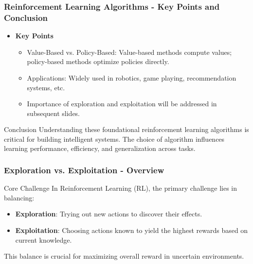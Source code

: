 \documentclass[aspectratio=169]{beamer}
\begin{document}
\begin{frame}[fragile]
    \frametitle{Reinforcement Learning Algorithms - Key Points and Conclusion}
    \begin{itemize}
        \item \textbf{Key Points}
        \begin{itemize}
            \item Value-Based vs. Policy-Based: Value-based methods compute values; policy-based methods optimize policies directly.
            \item Applications: Widely used in robotics, game playing, recommendation systems, etc.
            \item Importance of exploration and exploitation will be addressed in subsequent slides.
        \end{itemize}
    \end{itemize}
    \begin{block}{Conclusion}
        Understanding these foundational reinforcement learning algorithms is critical for building intelligent systems. The choice of algorithm influences learning performance, efficiency, and generalization across tasks.
    \end{block}
\end{frame}

\begin{frame}[fragile]
    \frametitle{Exploration vs. Exploitation - Overview}
    \begin{block}{Core Challenge}
        In Reinforcement Learning (RL), the primary challenge lies in balancing:
        \begin{itemize}
            \item \textbf{Exploration}: Trying out new actions to discover their effects.
            \item \textbf{Exploitation}: Choosing actions known to yield the highest rewards based on current knowledge.
        \end{itemize}
        This balance is crucial for maximizing overall reward in uncertain environments.
    \end{block}
\end{frame}
\end{document}
